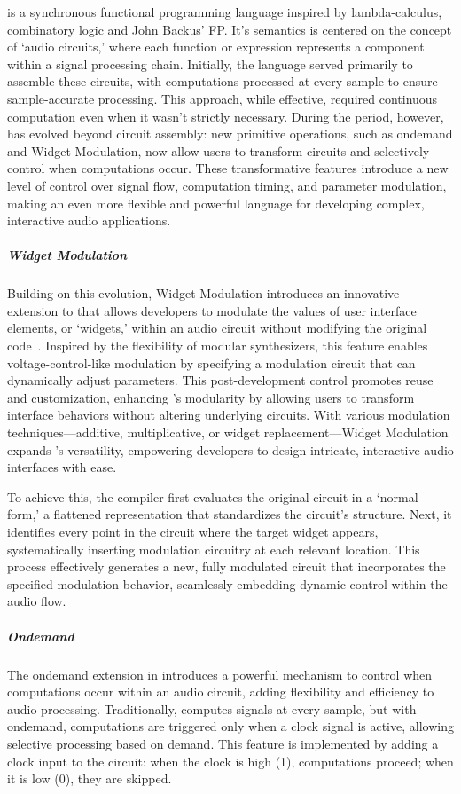\F{} is a synchronous functional programming language inspired by lambda-calculus, 
combinatory logic and John Backus’ FP.
It's semantics is centered on the concept of `audio
circuits,' where each function or expression represents a component
within a signal processing chain. Initially, the language served
primarily to assemble these circuits, with computations processed at
every sample to ensure sample-accurate processing. This approach, while
effective, required continuous computation even when it wasn't strictly
necessary. During the period, however, \F{} has evolved beyond circuit
assembly: new primitive operations, such as ondemand and Widget
Modulation, now allow users to transform circuits and selectively
control when computations occur. These transformative features introduce
a new level of control over signal flow, computation timing, and
parameter modulation, making \F{} an even more flexible and powerful
language for developing complex, interactive audio applications.

\subparagraph{Widget Modulation}

Building on this evolution, Widget Modulation introduces an innovative
extension to \F{} that allows developers to modulate the values of user
interface elements, or `widgets,' within an audio circuit without
modifying the original code~\cite{orlarey:hal-04762253}. Inspired by the flexibility of modular
synthesizers, this feature enables voltage-control-like modulation by
specifying a modulation circuit that can dynamically adjust parameters.
This post-development control promotes reuse and customization,
enhancing \F{}'s modularity by allowing users to transform interface
behaviors without altering underlying circuits. With various modulation
techniques---additive, multiplicative, or widget replacement---Widget
Modulation expands \F{}'s versatility, empowering developers to design
intricate, interactive audio interfaces with ease.

To achieve this, the \F{} compiler first evaluates the original circuit
in a `normal form,' a flattened representation that standardizes the
circuit's structure. Next, it identifies every point in the circuit
where the target widget appears, systematically inserting modulation
circuitry at each relevant location. This process effectively generates
a new, fully modulated circuit that incorporates the specified
modulation behavior, seamlessly embedding dynamic control within the
audio flow.

\subparagraph{Ondemand}

The ondemand extension in \F{} introduces a powerful mechanism to
control when computations occur within an audio circuit, adding
flexibility and efficiency to audio processing. Traditionally, \F{}
computes signals at every sample, but with ondemand, computations are
triggered only when a clock signal is active, allowing selective
processing based on demand. This feature is implemented by adding a
clock input to the circuit: when the clock is high (1), computations
proceed; when it is low (0), they are skipped.

